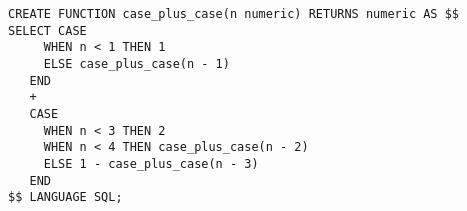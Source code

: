 \begin{verbatim}
CREATE FUNCTION case_plus_case(n numeric) RETURNS numeric AS $$
SELECT CASE
     WHEN n < 1 THEN 1
     ELSE case_plus_case(n - 1)
   END
   +
   CASE
     WHEN n < 3 THEN 2
     WHEN n < 4 THEN case_plus_case(n - 2)
     ELSE 1 - case_plus_case(n - 3)
   END
$$ LANGUAGE SQL;
\end{verbatim}